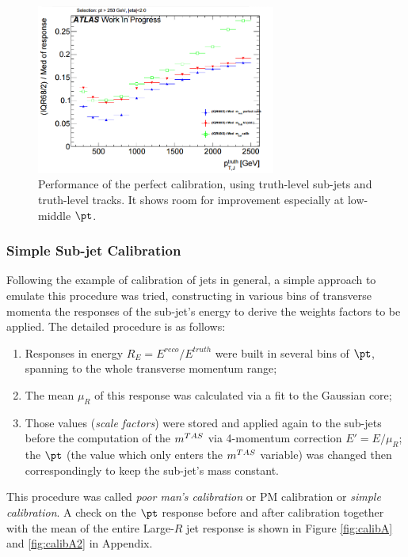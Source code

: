 \begin{figure}[!ht]
  \centering
      \includegraphics[width=0.7\textwidth]{jet_part/calib/perfcalib.png}
  \caption[Perfect calibration]{Performance of the perfect calibration, using truth-level sub-jets and truth-level tracks. It shows room for improvement especially at low-middle $\pt$.}
  \label{fig:perfcalib}
\end{figure}


\subsubsection{Simple Sub-jet Calibration}
Following the example of calibration of jets in general, a simple approach to emulate this procedure was tried, constructing in various bins of transverse momenta the responses of the sub-jet's energy to derive the weights factors to be applied. The detailed procedure is as follows:
\begin{enumerate}
 \item Responses in energy $R_E=E^{reco}/E^{truth}$ were built in several bins of $\pt$, spanning to the whole transverse momentum range;
 \item The mean $\mu_R$ of this response was calculated via a fit to the Gaussian core;
 \item Those values (\textit{scale factors}) were stored and applied again to the sub-jets before the computation of the $m^{TAS}$ via 4-momentum correction $E'=E/\mu_R$; the $\pt$ (the value which only enters the $m^{TAS}$ variable) was changed then correspondingly to keep the sub-jet's mass constant.
\end{enumerate}

This procedure was called \textit{poor man's calibration} or PM calibration or \textit{simple calibration}.
A check on the $\pt$ response before and after calibration together with the mean of the entire Large-$R$ jet response is shown in Figure \ref{fig:calibA} and \ref{fig:calibA2} in Appendix.

